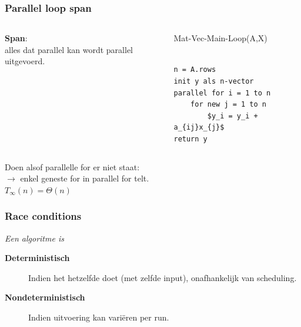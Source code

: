 \documentclass
   [kulak] %
   {kulakbeamer}
\begin{document}
\begin{frame}[fragile]
	\frametitle{Parallel loop span}
	
	
	
	\begin{columns}[T] %
		
		
			
		\begin{column}{.3\textwidth}
			\begin{minipage}[c][.6\textheight][c]{\linewidth}
				
				\textbf{Span}:\\  alles dat parallel kan
				 wordt parallel uitgevoerd.
				
			\end{minipage}
		\end{column}
		
		
		
		\begin{column}{.65\textwidth}
			
			Mat-Vec-Main-Loop(A,X)
			\begin{lstlisting}[style=CStyle]
			
n = A.rows
init y als n-vector
parallel for i = 1 to n
	for new j = 1 to n
		$y_i = y_i + a_{ij}x_{j}$
return y
			\end{lstlisting}
			
		\end{column}
		
		
		
		
		
	\end{columns}
	Doen alsof parallelle for er niet staat:\\
	$\rightarrow$ enkel geneste for in parallel for telt.\\
	$T_\infty (n) = \Theta(n)$
	
\end{frame}

\begin{frame}
	\frametitle{Race conditions}
	\textit{Een algoritme is}
	\begin{description}
		\item[\textbf{Deterministisch}]
		Indien het hetzelfde doet (met zelfde input), onafhankelijk van scheduling.
		\item[\textbf{Nondeterministisch}]
		Indien uitvoering kan variëren per run.
	\end{description}
	
\end{frame}
\end{document}
